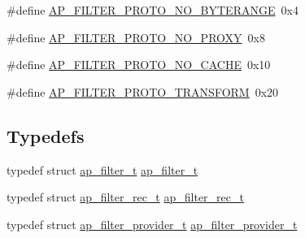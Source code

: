 \begin{DoxyCompactItemize}
\item 
\#define \hyperlink{group__APACHE__CORE__FILTER_ga21e47774862ea91cc5cb17ed07909f9f}{A\+P\+\_\+\+F\+I\+L\+T\+E\+R\+\_\+\+P\+R\+O\+T\+O\+\_\+\+N\+O\+\_\+\+B\+Y\+T\+E\+R\+A\+N\+GE}~0x4
\item 
\#define \hyperlink{group__APACHE__CORE__FILTER_gadb919dc2c3c2d9b76b4f61acd6d55139}{A\+P\+\_\+\+F\+I\+L\+T\+E\+R\+\_\+\+P\+R\+O\+T\+O\+\_\+\+N\+O\+\_\+\+P\+R\+O\+XY}~0x8
\item 
\#define \hyperlink{group__APACHE__CORE__FILTER_ga9778027866735946cf9fae4791ce3580}{A\+P\+\_\+\+F\+I\+L\+T\+E\+R\+\_\+\+P\+R\+O\+T\+O\+\_\+\+N\+O\+\_\+\+C\+A\+C\+HE}~0x10
\item 
\#define \hyperlink{group__APACHE__CORE__FILTER_gab2a7a45e9e5e4a2c6bade7072639e6ca}{A\+P\+\_\+\+F\+I\+L\+T\+E\+R\+\_\+\+P\+R\+O\+T\+O\+\_\+\+T\+R\+A\+N\+S\+F\+O\+RM}~0x20
\end{DoxyCompactItemize}
\subsection*{Typedefs}
\begin{DoxyCompactItemize}
\item 
typedef struct \hyperlink{structap__filter__t}{ap\+\_\+filter\+\_\+t} \hyperlink{group__APACHE__CORE__FILTER_gad543721589f525abb9b0fbd5cb8363e6}{ap\+\_\+filter\+\_\+t}
\item 
typedef struct \hyperlink{structap__filter__rec__t}{ap\+\_\+filter\+\_\+rec\+\_\+t} \hyperlink{group__APACHE__CORE__FILTER_ga3b4690a21db5ddea3704c3aba182eef0}{ap\+\_\+filter\+\_\+rec\+\_\+t}
\item 
typedef struct \hyperlink{structap__filter__provider__t}{ap\+\_\+filter\+\_\+provider\+\_\+t} \hyperlink{group__APACHE__CORE__FILTER_gaa3e9953031f05244ee1ddd40b048de69}{ap\+\_\+filter\+\_\+provider\+\_\+t}
\end{DoxyCompactItemize}
